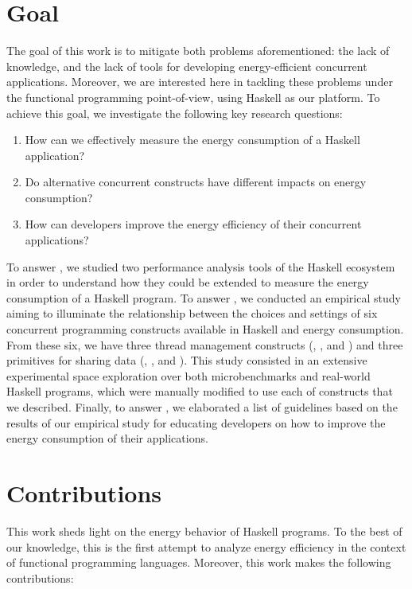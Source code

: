 \section{Goal}
The goal of this work is to mitigate both problems aforementioned: the lack of knowledge, and the lack of tools for developing energy-efficient concurrent applications. Moreover, we are interested here in tackling these problems under the functional programming point-of-view, using Haskell as our platform. To achieve this goal, we investigate the following key research questions:

\begin{enumerate}[label=\RQ{\arabic*}.]
  \item How can we effectively measure the energy consumption of a Haskell application?
  \item Do alternative concurrent constructs have different impacts on energy consumption?
  \item How can developers improve the energy efficiency of their concurrent applications?
\end{enumerate}

To answer , we studied two performance analysis tools of the Haskell ecosystem in order to understand how they could be extended to measure the energy consumption of a Haskell program. To answer , we conducted an empirical study aiming to illuminate the relationship between the choices and settings of six concurrent programming constructs available in Haskell and energy consumption. From these six, we have three thread management constructs (\forkIO, \forkOn, and \forkOS) and three primitives for sharing data (\MVar, \TMVar, and \TVar). This study consisted in an extensive experimental space exploration over both microbenchmarks and real-world Haskell programs, which were manually modified to use each of constructs that we described. Finally, to answer , we elaborated a list of guidelines based on the results of our empirical study for educating developers on how to improve the energy consumption of their applications.


\section{Contributions}
This work sheds light on the energy behavior of Haskell programs. To the best of our knowledge, this is the first attempt to analyze energy efficiency in the context of functional programming languages. Moreover, this work makes the following contributions:

